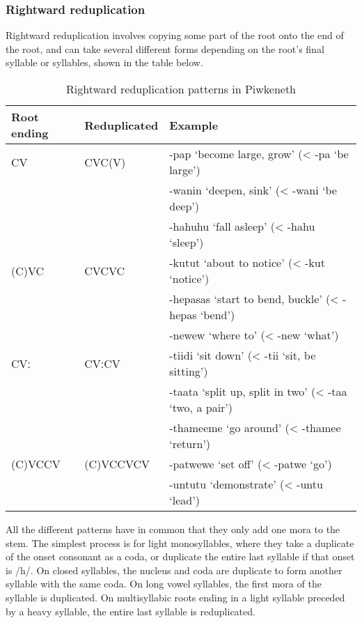 \documentclass[executivepaper,10pt,twoside,openany,draft]{memoir}
\newcommand{\lang}{Piwkeneth}
\newcommand{\longv}{ː}
\begin{document}
\subsubsection{Rightward reduplication}

Rightward reduplication involves copying some part of the root onto the end of the root, and can take several different forms depending on the root's final syllable or syllables, shown in the table below.

\begin{table}[ht]
    \centering
    \begin{tabular}{lll}
        \toprule
        Root ending & Reduplicated & Example \\
        \midrule
        CV    & CVC(V)  & -pap `become large, grow' (< -pa `be large') \\
              &         & -wanin `deepen, sink' (< -wani `be deep') \\
              &         & -hahuhu `fall asleep' (< -hahu `sleep') \\
        (C)VC & CVCVC   & -kutut `about to notice' (< -kut `notice') \\
              &         & -hepasas `start to bend, buckle' (< -hepas `bend') \\
              &         & -newew `where to' (< -new `what') \\
        CV\longv{} & CV\longv{}CV & -tiidi `sit down' (< -tii `sit, be sitting') \\
              &         & -taata `split up, split in two' (< -taa `two, a pair') \\
              &         & -thameeme `go around' (< -thamee `return') \\
        (C)VCCV & (C)VCCVCV & -patwewe `set off' (< -patwe `go') \\
              &         & -untutu `demonstrate' (< -untu `lead') \\
        \bottomrule
    \end{tabular}
    \caption{Rightward reduplication patterns in \lang}
\end{table}

All the different patterns have in common that they only add one mora to the stem. The simplest process is for light monosyllables, where they take a duplicate of the onset consonant as a coda, or duplicate the entire last syllable if that onset is /h/. On closed syllables, the nucleus and coda are duplicate to form another syllable with the same coda. On long vowel syllables, the first mora of the syllable is duplicated. On multisyllabic roots ending in a light syllable preceded by a heavy syllable, the entire last syllable is reduplicated.
\end{document}
